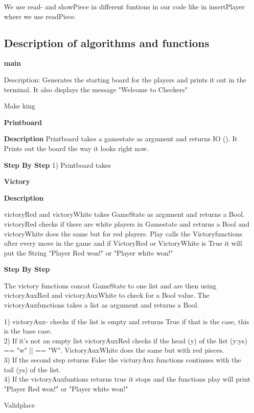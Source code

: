 \documentclass[12pt,a4paper]{article}
\begin{document}
We use read- and showPiece in different funtions in our code like in insertPlayer where we use readPiece.

\subsection{Description of algorithms and functions}
\textbf{\large {main}}

Description: Generates the starting board for the players and prints it out in the terminal.
It also displays the message "Welcome to Checkers"


Make king

\textbf{\Large{Printboard}}

\textbf{Description}
Printboard takes a gamestate as argument and returns IO (). It Prints out the board the way it looks right now. 

\textbf{Step By Step}
1) Printboard takes 



\textbf{\large {Victory}}

\textbf{Description}

victoryRed and victoryWhite takes GameState as argument and returns a Bool. victoryRed checks if there are white players in Gamestate and returns a Bool and victoryWhite does the same but for red players. Play calls the Victoryfunctions after every move in the game and if VictoryRed or VictoryWhite is True it will put the String "Player Red won!" or "Player white won!"

\textbf{Step By Step}

The victory functions concat GameState to one list and are then using victoryAuxRed and victoryAuxWhite to check for a Bool value. The victoryAuxfunctions takes a list as argument and returns a Bool.

1) victoryAux- checks if the list is empty and returns True if that is the case, this is the base case. \\
2) If it's not an empty list victoryAuxRed checks if the head (y) of the list (y:ys) == "w" || == "W". VictoryAuxWhite does the same but with red pieces.\\
3) If the second step returns False the victuryAux functions continues with the tail (ys) of the list.\\
4) If the victoryAuxfuntions returns true it stops and the functions play will print "Player Red won!" or "Player white won!"

Validplace
\end{document}
